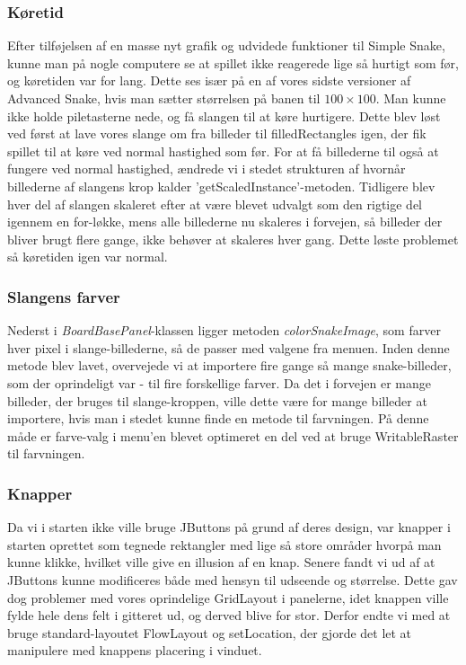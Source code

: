 \subsubsection{Køretid}
Efter tilføjelsen af en masse nyt grafik og udvidede funktioner til Simple Snake, kunne man på nogle computere se at spillet ikke reagerede lige så hurtigt som før, og køretiden var for lang.
Dette ses især på en af vores sidste versioner af Advanced Snake, hvis man sætter størrelsen på banen til $100\times 100$. Man kunne ikke holde piletasterne nede, og få slangen til at køre hurtigere. Dette blev løst ved først at lave vores slange om fra billeder til filledRectangles igen, der fik spillet til at køre ved normal hastighed som før. 
For at få billederne til også at fungere ved normal hastighed, ændrede vi i stedet strukturen af hvornår billederne af slangens krop kalder 'getScaledInstance'-metoden. Tidligere blev hver del af slangen skaleret efter at være blevet udvalgt som den rigtige del igennem en for-løkke, mens alle billederne nu skaleres i forvejen, så billeder der bliver brugt flere gange, ikke behøver at skaleres hver gang. Dette løste problemet så køretiden igen var normal.

\subsubsection{Slangens farver}
Nederst i \textit{BoardBasePanel}-klassen ligger metoden \textit{colorSnakeImage}, som farver hver pixel i slange-billederne, så de passer med valgene fra menuen. 
Inden denne metode blev lavet, overvejede vi at importere fire gange så mange snake-billeder, som der oprindeligt var - til fire forskellige farver. Da det i forvejen er mange billeder, der bruges til slange-kroppen, ville dette være for mange billeder at importere, hvis man i stedet kunne finde en metode til farvningen.
På denne måde er farve-valg i menu'en blevet optimeret en del ved at bruge WritableRaster til farvningen.

\subsubsection{Knapper}
Da vi i starten ikke ville bruge JButtons på grund af deres design, var knapper i starten oprettet som tegnede rektangler med lige så store områder hvorpå man kunne klikke, hvilket ville give en illusion af en knap. Senere fandt vi ud af at JButtons kunne modificeres både med hensyn til udseende og størrelse. Dette gav dog problemer med vores oprindelige GridLayout i panelerne, idet knappen ville fylde hele dens felt i gitteret ud, og derved  blive for stor. Derfor endte vi med at bruge standard-layoutet FlowLayout og setLocation, der gjorde det let at manipulere med knappens placering i vinduet.

